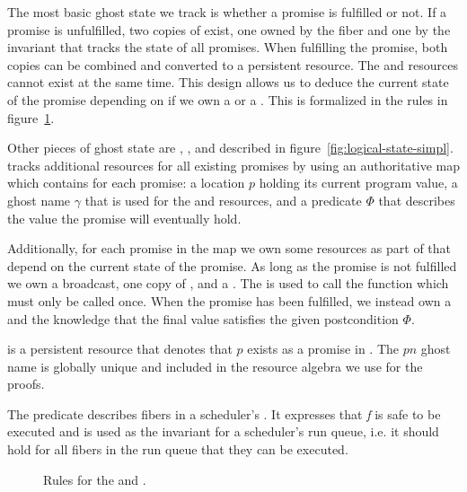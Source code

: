 The most basic ghost state we track is whether a promise is fulfilled or not.
If a promise  is unfulfilled, two copies of \gspwait{} exist, one owned by the fiber and one by the invariant that tracks the state of all promises.
When fulfilling the promise, both copies can be combined and converted to a persistent \gspdone{} resource.
The \gspwait{} and \gspdone{} resources cannot exist at the same time.
This design allows us to deduce the current state of the promise depending on if we own a \gspwait{} or a \gspdone{}.
This is formalized in the rules in figure~\ref{fig:promise-state-rules}.

Other pieces of ghost state are \gsPInvIn{}, \gsIsPr{}, and \gsReady{} described in figure~\ref{fig:logical-state-simpl}.
\gsPInvIn{} tracks additional resources for all existing promises by using an authoritative map which contains for each promise:
a location \(p\) holding its current program value, a ghost name \(\gamma\) that is used for the \gspwait{} and \gspdone{} resources, and a predicate \(Φ\) that describes the value the promise will eventually hold.

Additionally, for each promise in the map we own some resources as part of \gsPInvIn{} that depend on the current state of the promise.
As long as the promise is not fulfilled we own a broadcast, one copy of \gspwait{}, and a \gssignal{}.
The \gssignal{} is used to call the  function which must only be called once.
When the promise has been fulfilled, we instead own a \gspdone{} and the knowledge that the final value satisfies the given postcondition \(Φ\).

\gsIsPr{} is a persistent resource that denotes that \(p\) exists as a promise in \gsPInvIn{}. The \(pn\) ghost name is globally unique and included in the resource algebra we use for the proofs.

The \gsReady{} predicate describes fibers in a scheduler's .
It expresses that \emph{f} is safe to be executed and is used as the invariant for a scheduler's run queue, i.e. it should hold for all fibers in the run queue that they can be executed.

\begin{figure}
  \caption{Rules for the \gspwait{} and \gspdone{}.}
  \label{fig:promise-state-rules}
\end{figure}

